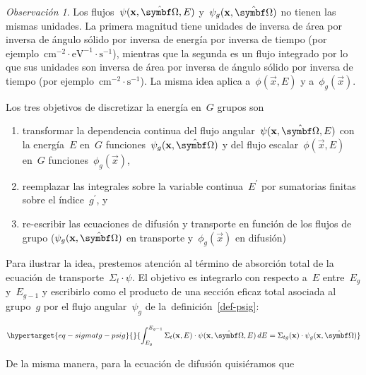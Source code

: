 \documentclass[
  12pt,
  a4paper,
  table]{scrbook}
\providecommand{\tightlist}{%
  \setlength{\itemsep}{0pt}\setlength{\parskip}{0pt}}\usepackage{longtable,booktabs,array}
\theoremstyle{plain}
\theoremstyle{definition}
\theoremstyle{plain}
\theoremstyle{plain}
\theoremstyle{remark}
\newtheorem*{remark}{Observación}
\begin{document}
\begin{remark}

Los flujos~\(\psi(\vec{x}, \omegaversor, E)\)
y~\(\psi_g(\vec{x}, \omegaversor)\) no tienen las mismas unidades. La
primera magnitud tiene unidades de inversa de área por inversa de ángulo
sólido por inversa de energía por inversa de tiempo (por
ejemplo~\(\text{cm}^{-2} \cdot \text{eV}^{-1} \cdot \text{s}^{-1}\)),
mientras que la segunda es un flujo integrado por lo que sus unidades
son inversa de área por inversa de ángulo sólido por inversa de tiempo
(por ejemplo~\(\text{cm}^{-2} \cdot \text{s}^{-1}\)). La misma idea
aplica a~\(\phi(\vec{x}, E)\) y a~\(\phi_g(\vec{x})\).

\end{remark}

Los tres objetivos de discretizar la energía en~\(G\) grupos son

\begin{enumerate}
\def\labelenumi{\arabic{enumi}.}
\tightlist
\item
  transformar la dependencia continua del flujo
  angular~\(\psi(\vec{x}, \omegaversor, E)\) con la energía~\(E\)
  en~\(G\) funciones~\(\psi_g(\vec{x},\omegaversor)\) y del flujo
  escalar~\(\phi(\vec{x}, E)\) en~\(G\) funciones~\(\phi_g(\vec{x})\),
\item
  reemplazar las integrales sobre la variable continua~\(E^\prime\) por
  sumatorias finitas sobre el índice~\(g^\prime\), y
\item
  re-escribir las ecuaciones de difusión y transporte en función de los
  flujos de grupo (\(\psi_g(\vec{x},\omegaversor)\) en transporte
  y~\(\phi_g(\vec{x})\) en difusión)
\end{enumerate}

Para ilustrar la idea, prestemos atención al término de absorción total
de la ecuación de transporte~\(\Sigma_t \cdot \psi\). El objetivo es
integrarlo con respecto a~\(E\) entre~\(E_g\) y~\(E_{g-1}\) y escribirlo
como el producto de una sección eficaz total asociada al grupo~\(g\) por
el flujo angular~\(\psi_g\) de la~definición~\ref{def-psig}:

\begin{equation}\protect\hypertarget{eq-sigmatg-psig}{}{
\int_{E_g}^{E_{g-1}} \Sigma_t(\vec{x}, E) \cdot \psi(\vec{x}, \omegaversor, E) \, dE =
\Sigma_{t g}(\vec{x}) \cdot \psi_g(\vec{x}, \omegaversor)
}\label{eq-sigmatg-psig}\end{equation}

De la misma manera, para la ecuación de difusión quisiéramos que
\end{document}
